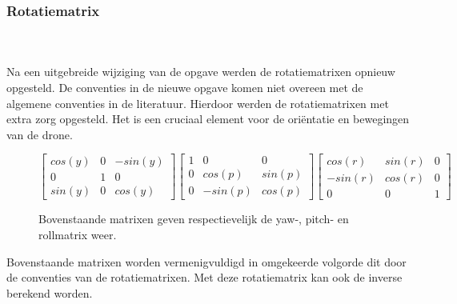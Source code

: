 \subsubsection{Rotatiematrix}
\\\\
Na een uitgebreide wijziging van de opgave werden de rotatiematrixen opnieuw opgesteld. De conventies in de nieuwe opgave komen niet overeen met de algemene conventies in de literatuur. Hierdoor werden de rotatiematrixen met extra zorg opgesteld. Het is een cruciaal element voor de ori\"entatie en bewegingen van de drone.

\begin{figure}[h!]
	\centering
		\(
		\begin{bmatrix} 
			cos(y) & 0 & -sin(y) \\ 
			0 & 1 & 0 \\
			sin(y) & 0 & cos(y)
		\end{bmatrix}
		\begin{bmatrix} 
			1 & 0 & 0 \\ 
			0 & cos(p) & sin(p) \\
			0 & -sin(p) & cos(p)
		\end{bmatrix}
		\begin{bmatrix} 
			cos(r) & sin(r) & 0 \\ 
			-sin(r) & cos(r) & 0 \\
			0 & 0 & 1
		\end{bmatrix}
		\)
	\caption{Bovenstaande matrixen geven respectievelijk de yaw-, pitch- en rollmatrix weer.}
\end{figure}
\noindent
Bovenstaande matrixen worden vermenigvuldigd in omgekeerde volgorde dit door de conventies van de rotatiematrixen. Met deze rotatiematrix kan ook de inverse berekend worden.